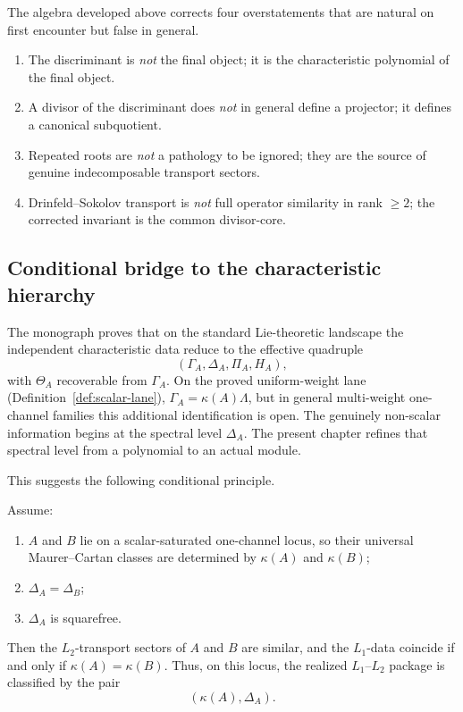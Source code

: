 The algebra developed above corrects four overstatements that are natural on first encounter but false in general.

\begin{enumerate}[label=\textup{(\arabic*)}]
\item The discriminant is \emph{not} the final object; it is the characteristic polynomial of the final object.

\item A divisor of the discriminant does \emph{not} in general define a projector; it defines a canonical subquotient.

\item Repeated roots are \emph{not} a pathology to be ignored; they are the source of genuine indecomposable transport sectors.

\item Drinfeld--Sokolov transport is \emph{not} full operator similarity in rank \(\ge 2\); the corrected invariant is the common divisor-core.
\end{enumerate}

\subsection{Conditional bridge to the characteristic hierarchy}

The monograph proves that on the standard Lie-theoretic landscape the independent characteristic data reduce to the effective quadruple
\[
(\Gamma_A,\Delta_A,\Pi_A,H_A),
\]
with \(\Theta_A\) recoverable from \(\Gamma_A\). On the proved
uniform-weight lane (Definition~\ref{def:scalar-lane}),
\(\Gamma_A = \kappa(A)\Lambda\), but in general multi-weight
one-channel families this additional identification is open. The genuinely
non-scalar information begins at the spectral level \(\Delta_A\).
The present chapter refines that spectral level from a polynomial to an actual module.

This suggests the following conditional principle.

\begin{proposition}
\ClaimStatusProvedHere
Assume:
\begin{enumerate}[label=\textup{(\roman*)}]
\item \(A\) and \(B\) lie on a scalar-saturated one-channel locus, so their universal Maurer--Cartan classes are determined by \(\kappa(A)\) and \(\kappa(B)\);
\item \(\Delta_A=\Delta_B\);
\item \(\Delta_A\) is squarefree.
\end{enumerate}
Then the \(L_2\)-transport sectors of \(A\) and \(B\) are similar, and the \(L_1\)-data coincide if and only if \(\kappa(A)=\kappa(B)\).
Thus, on this locus, the realized \(L_1\)--\(L_2\) package is classified by the pair
\[
(\kappa(A),\Delta_A).
\]
\end{proposition}

